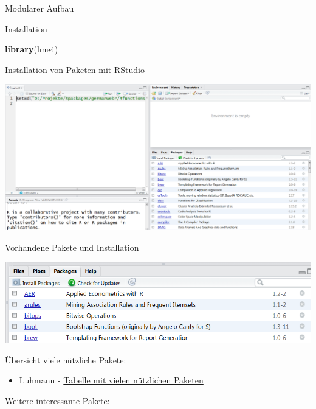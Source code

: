 \documentclass[ignorenonframetext,]{beamer}
\newenvironment{Shaded}{}{}
\newcommand{\KeywordTok}[1]{\textcolor[rgb]{0.00,0.44,0.13}{\textbf{{#1}}}}
\newcommand{\NormalTok}[1]{{#1}}
\providecommand{\tightlist}{%
\setlength{\itemsep}{0pt}\setlength{\parskip}{0pt}}
\begin{document}
\begin{frame}[fragile]{Modularer Aufbau}
\begin{block}{Installation}
\begin{Shaded}
\begin{Highlighting}[]
\KeywordTok{library}\NormalTok{(lme4)}
\end{Highlighting}
\end{Shaded}

\end{block}

\begin{block}{Installation von Paketen mit RStudio}

\includegraphics{./tex2pdf.9796/c6c143900ad8bf587abcf5f17c830e0628827a25.png}

\end{block}

\begin{block}{Vorhandene Pakete und Installation}

\includegraphics{./tex2pdf.9796/0af3f1dcb1917a9b105b8ccb6be1cf1a459287cd.png}

\end{block}

\begin{block}{Übersicht viele nützliche Pakete:}

\begin{itemize}
\tightlist
\item
  Luhmann -
  \href{http://www.beltz.de/fileadmin/beltz/downloads/OnlinematerialienPVU/28090_Luhmann/Verwendete\%20Pakete.pdf}{Tabelle
  mit vielen nützlichen Paketen}
\end{itemize}

\begin{block}{Weitere interessante Pakete:}


\end{block}
\end{block}
\end{frame}
\end{document}
